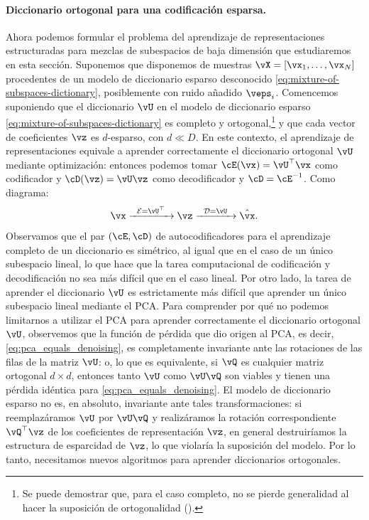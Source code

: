 \documentclass[../../book-main.tex]{subfiles}
\begin{document}
\paragraph{Diccionario ortogonal para una codificación esparsa.}
Ahora podemos formular el problema del aprendizaje de representaciones estructuradas
para mezclas de subespacios de baja dimensión que estudiaremos en esta sección.
Suponemos que disponemos de muestras $\vX = [\vx_1, \dots, \vx_N]$ procedentes de un
modelo de diccionario esparso desconocido
\eqref{eq:mixture-of-subspaces-dictionary}, posiblemente con
ruido añadido $\veps_i$.
Comencemos suponiendo que el diccionario $\vU$ en el modelo de diccionario
esparso \eqref{eq:mixture-of-subspaces-dictionary} es completo y
ortogonal,\footnote{Se puede demostrar que, para el caso completo,
    no se pierde generalidad al hacer la suposición de ortogonalidad
().} y que cada vector de coeficientes $\vz$
es $d$-esparso, con $d \ll D$.
En este contexto, el aprendizaje de representaciones equivale a
aprender correctamente el diccionario ortogonal $\vU$ mediante optimización:
entonces podemos tomar $\cE(\vx) = \vU^\top \vx$ como codificador y $\cD(\vz) = \vU \vz$
como decodificador y $\cD = \cE^{-1}$. Como diagrama:
\begin{equation}
    \vx \xrightarrow{\hspace{2mm} \mathcal{E} = \vU^\top
    \hspace{2mm}}  \vz \xrightarrow{\hspace{2mm} \mathcal{D} = \vU
    \hspace{2mm}}   \hat{\vx}.
    \label{eqn:autoencoding-DL}
\end{equation}
Observamos que el par $(\cE, \cD)$ de autocodificadores para el aprendizaje
completo de un diccionario es simétrico, al igual que en el caso de un único
subespacio lineal, lo que hace que la tarea computacional de codificación y decodificación no
sea más difícil que en el caso lineal. Por otro lado, la tarea
de aprender el diccionario $\vU$ es estrictamente más difícil que
aprender un único subespacio lineal mediante el PCA.
Para comprender por qué no podemos limitarnos a utilizar el PCA para aprender correctamente el
diccionario ortogonal $\vU$, observemos que la
función de pérdida que dio origen al PCA, es decir, \eqref{eq:pca_equals_denoising}, es
completamente invariante ante las rotaciones de las filas de la matriz $\vU$: o, lo que es equivalente, si
$\vQ$ es cualquier matriz ortogonal $d \times d$, entonces tanto $\vU$ como $\vU \vQ$ son
viables y tienen una pérdida idéntica para \eqref{eq:pca_equals_denoising}. El
modelo de diccionario esparso no es, en absoluto, invariante ante tales transformaciones: si
reemplazáramos $\vU$ por $\vU \vQ$ y realizáramos la rotación correspondiente $\vQ^\top \vz$
de los coeficientes de representación $\vz$, en general destruiríamos
la estructura de esparcidad de $\vz$, lo que violaría la suposición del modelo.
Por lo tanto, necesitamos nuevos algoritmos para aprender diccionarios ortogonales.
\end{document}
